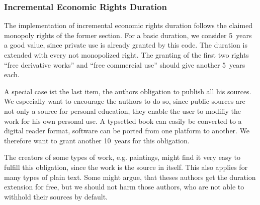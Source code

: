 \subsubsection{Incremental Economic Rights Duration}

The implementation of incremental economic rights duration follows the claimed monopoly rights of the former section. For a basic duration, we consider 5~years a good value, since private use is already granted by this code. The duration is extended with every not monopolized right. The granting of the first two rights ``free derivative works'' and ``free commercial use'' should give another 5~years each.

A special case ist the last item, the authors obligation to publish all his sources. We especially want to encourage the authors to do so, since public sources are not only a source for personal education, they enable the user to modifiy the work for his own personal use. A typsetted book can easily be converted to a digital reader format, software can be ported from one platform to another. We therefore want to grant another 10~years for this obligation.

The creators of some types of work, e.g. paintings, might find it very easy to fulfill this obligation, since the work is the source in itself. This also applies for many types of plain text. Some might argue, that theses authors get the duration extension for free, but we should not harm those authors, who are not able to withhold their sources by default.



